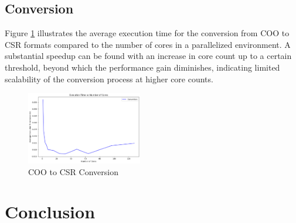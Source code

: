 \documentclass[conference]{IEEEtran}
\begin{document}
\subsection{Conversion}
Figure \ref{fig:conversion} illustrates the average execution time for the conversion from COO to CSR formats compared to the number of cores in a parallelized environment. 
A substantial speedup can be found with an increase in core count up to a certain threshold, beyond which the performance gain diminishes, indicating limited scalability of the conversion process at higher core counts.
\begin{figure}[H]
    \centering
    \includegraphics[width=0.45\textwidth]{../img/conversion.png}
    \caption{COO to CSR Conversion}
    \label{fig:conversion}
\end{figure}

\section{Conclusion}
\end{document}
